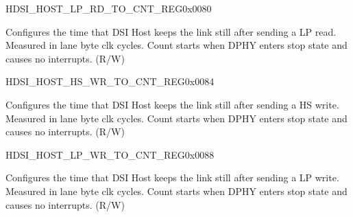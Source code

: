 \begin{register}{H}{DSI\_HOST\_LP\_RD\_TO\_CNT\_REG}{0x0080}\label{regdesc:DSIHOSTLPRDTOCNTREG}
%
%
\regnewline%
\begin{regdesc}\begin{reglist}
\label{fielddesc:DSIHOSTLPRDTOCNT}\item [DSI\_HOST\_LP\_RD\_TO\_CNT] Configures the time that DSI Host keeps the link still after sending a LP read. Measured in lane byte clk cycles. Count starts when DPHY enters stop state and causes no interrupts. (R/W)
\end{reglist}\end{regdesc}
\end{register}


\begin{register}{H}{DSI\_HOST\_HS\_WR\_TO\_CNT\_REG}{0x0084}\label{regdesc:DSIHOSTHSWRTOCNTREG}
%
%
\regnewline%
\begin{regdesc}\begin{reglist}
\label{fielddesc:DSIHOSTHSWRTOCNT}\item [DSI\_HOST\_HS\_WR\_TO\_CNT] Configures the time that DSI Host keeps the link still after sending a HS write. Measured in lane byte clk cycles. Count starts when DPHY enters stop state and causes no interrupts. (R/W)
\end{reglist}\end{regdesc}
\end{register}


\begin{register}{H}{DSI\_HOST\_LP\_WR\_TO\_CNT\_REG}{0x0088}\label{regdesc:DSIHOSTLPWRTOCNTREG}
%
%
\regnewline%
\begin{regdesc}\begin{reglist}
\label{fielddesc:DSIHOSTLPWRTOCNT}\item [DSI\_HOST\_LP\_WR\_TO\_CNT] Configures the time that DSI Host keeps the link still after sending a LP write. Measured in lane byte clk cycles. Count starts when DPHY enters stop state and causes no interrupts. (R/W)
\end{reglist}\end{regdesc}
\end{register}


